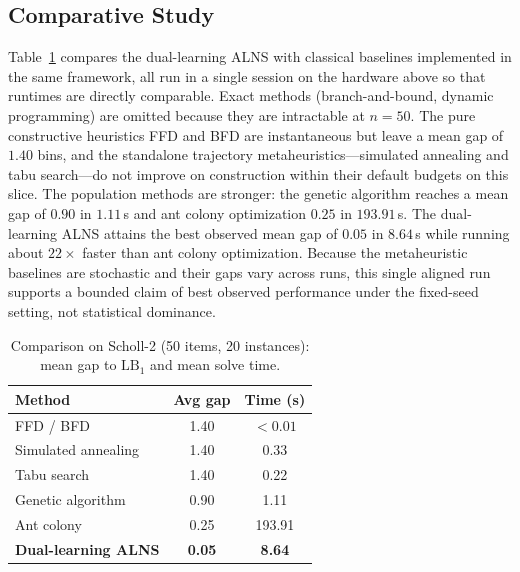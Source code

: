 \documentclass[conference]{IEEEtran}
\begin{document}
\subsection{Comparative Study}
Table~\ref{tab:compare} compares the dual-learning ALNS with classical baselines
implemented in the same framework, all run in a single session on the hardware
above so that runtimes are directly comparable. Exact methods (branch-and-bound,
dynamic programming) are omitted because they are intractable at $n=50$. The pure
constructive heuristics FFD and BFD are instantaneous but leave a mean gap of
$1.40$ bins, and the standalone trajectory metaheuristics---simulated annealing
and tabu search---do not improve on construction within their default budgets on
this slice. The population methods are stronger: the genetic algorithm reaches a
mean gap of $0.90$ in $1.11$\,s and ant colony optimization $0.25$ in
$193.91$\,s. The dual-learning ALNS attains the best observed mean gap of $0.05$ in
$8.64$\,s while running about $22\times$ faster than ant colony optimization.
Because the metaheuristic baselines are stochastic and their gaps vary across
runs, this single aligned run supports a bounded claim of best observed
performance under the fixed-seed setting, not statistical dominance.

\begin{table}[htbp]
	\caption{Comparison on Scholl-2 (50 items, 20 instances): mean gap to $\mathrm{LB}_1$ and mean solve time.}
	\label{tab:compare}
	\centering
	\begin{tabular}{l c c}
		\hline
		\textbf{Method}             & \textbf{Avg gap} & \textbf{Time (s)} \\
		\hline
		FFD / BFD                   & 1.40             & $<0.01$           \\
		Simulated annealing         & 1.40             & 0.33              \\
		Tabu search                 & 1.40             & 0.22              \\
		Genetic algorithm           & 0.90             & 1.11              \\
		Ant colony                  & 0.25             & 193.91            \\
		\textbf{Dual-learning ALNS} & \textbf{0.05}    & \textbf{8.64}     \\
		\hline
	\end{tabular}
\end{table}
\end{document}
